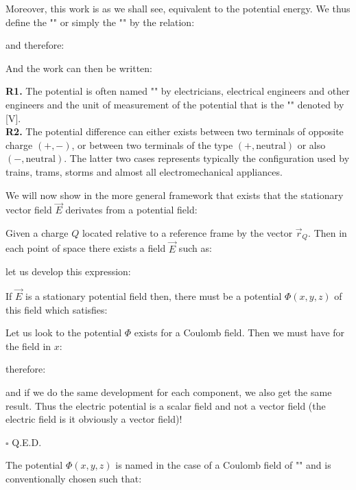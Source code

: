	Moreover, this work is as we shall see, equivalent to the potential energy. We thus define the "" or simply the "" by the relation:
	
	and therefore:
	
	And the work can then be written\label{electrostatic potential energy}:
	
	\begin{tcolorbox}[title=Remarks,colframe=black,arc=10pt]
	\textbf{R1.} The potential is often named "" by electricians, electrical engineers and other engineers and the unit of measurement of the potential that is the "" denoted by [V].\\
	
	\textbf{R2.} The potential difference can either exists between two terminals of opposite charge $(+, -)$, or between two terminals of the type $(+, \text{neutral})$ or also $(-, \text{neutral})$. The latter two cases represents typically the configuration used by trains, trams, storms and almost all electromechanical appliances.
	\end{tcolorbox}
	\begin{theorem}
	We will now show in the more general framework that exists that the stationary vector field $\vec{E}$ derivates from a potential field:
	\end{theorem}
	\begin{dem}
	Given a charge $Q$ located relative to a reference frame by the vector $\vec{r}_Q$. Then in each point of space there exists a field $\vec{E}$ such as:
	
	let us develop this expression:
	
	If $\vec{E}$ is a stationary potential field then, there must be a potential $\Phi(x,y,z)$ of this field which satisfies:
	
	Let us look to the potential $\Phi$ exists for a Coulomb field. Then we must have for the field in $x$:
	
	therefore:
	
	and if we do the same development for each component, we also get the same result. Thus the electric potential is a scalar field and not a vector field (the electric field is it obviously a vector field)!
	\begin{flushright}
		$\square$  Q.E.D.
	\end{flushright}
	\end{dem}
	The potential $\Phi(x,y,z)$ is named in the case of a Coulomb field of "" and is conventionally chosen such that:
	
